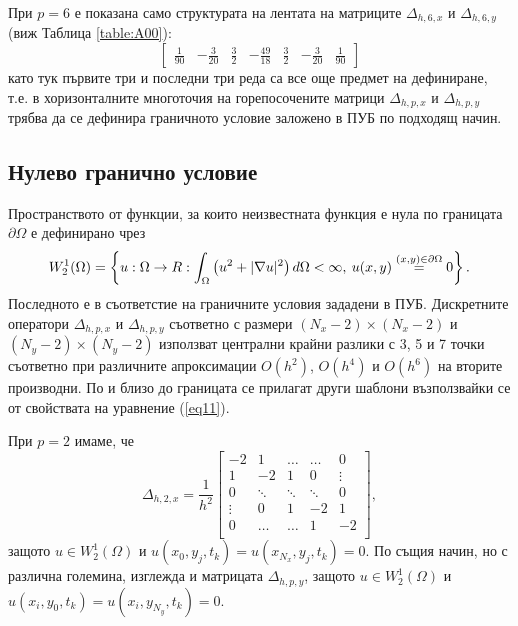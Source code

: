 \documentclass{article}
\newcommand{\be}{\begin{equation}}
\newcommand{\ee}{\end{equation}}
\newcommand{\rf}[1]{(\ref{#1})}
\theoremstyle{remark}
\begin{document}
При $p=6$ е показана само структурата на лентата на матриците $\Delta_{h,6,x}$ и $\Delta_{h,6,y}$ (виж Таблица \ref{table:A00}):
\[
\begin{bmatrix}
    \frac{1}{90}	& -\frac{3}{20}	& \frac{3}{2}         	& -\frac{49}{18}	&  \frac{3}{2}    	 &   -\frac{3}{20}	  &      \frac{1}{90}
\end{bmatrix}
\]
като тук първите три и последни три реда са все още предмет на дефиниране, т.е. в хоризонталните многоточия на горепосочените матрици $\Delta_{h,p,x}$ и $\Delta_{h,p,y}$ трябва да се дефинира граничното условие заложено в ПУБ по подходящ начин.

\subsection{Нулево гранично условие}\label{zeroBndHead}
Пространството от функции, за които неизвестната функция е нула по границата $\partial\Omega$ е дефинирано чрез
\be\label{funSpace}
W_2^1(\Omega) =\left\{ u:\Omega \rightarrow \\R : \int_{\Omega} \left(u^2 + |\nabla u|^2 \right)d\Omega < \infty, \: u(x,y) \overset{(x, y) \in \partial\Omega}{=} 0 \right\}.
\ee
Последното е в съответстие на граничните условия зададени в ПУБ. Дискретните оператори $\Delta_{h,p,x}$ и $\Delta_{h,p,y}$ съответно с размери $(N_x-2) \times (N_x-2)$ и $(N_y-2)\times(N_y-2)$ използват централни крайни разлики с 3, 5 и 7 точки съответно при различните апроксимации $O(h^2)$, $O(h^4)$ и $O(h^6)$ на вторите производни. По и близо до границата се прилагат други шаблони възползвайки се от свойствата на уравнение \rf{eq11}. 

При $p=2$ имаме, че 
\[
\Delta_{h,2,x} = \frac{1}{h^2}
\begin{bmatrix}
    -2	       & 1        &     \dots   &   \dots        & 0   \\
    1               & -2            &   1           &   0               & \vdots    \\
        0           & \ddots        &    \ddots    &   \ddots       &  0 \\ 
    \vdots       &     0            &  1     	& -2    	   & 1 \\
    0               & \dots          &  \dots         & 1  	   & -2 \\
\end{bmatrix},
\]
защото $u \in W_2^1(\Omega)$ и $u(x_0, y_j, t_k) = u(x_{N_x}, y_j, t_k) = 0$. По същия начин, но с различна големина, изглежда и матрицата $\Delta_{h,p,y}$, защото $u \in W_2^1(\Omega)$ и $u(x_i, y_0, t_k) = u(x_i, y_{N_y}, t_k) = 0$. 
\end{document}
